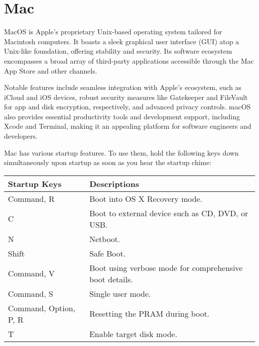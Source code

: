 \chapter{Mac}
\thispagestyle{fancy}
\lstset{}\lstset{language=Bash, style=shellstyle}

MacOS is Apple's proprietary Unix-based operating system tailored for Macintosh computers. It boasts a sleek graphical user interface (GUI) atop a Unix-like foundation, offering stability and security. Its software ecosystem encompasses a broad array of third-party applications accessible through the Mac App Store and other channels.

Notable features include seamless integration with Apple's ecosystem, such as iCloud and iOS devices, robust security measures like Gatekeeper and FileVault for app and disk encryption, respectively, and advanced privacy controls. macOS also provides essential productivity tools and development support, including Xcode and Terminal, making it an appealing platform for software engineers and developers.


\begin{fancybox}{}	
	Mac has various startup features. To use them, hold the following keys down simultaneously upon startup as soon as you hear the startup chime:
	\begin{center}
		\begin{tabular}{l|l}
			Startup Keys & Descriptions \\
			\hline
			Command, R & Boot into OS X Recovery mode. \\
			C & Boot to external device such as CD, DVD, or USB. \\
			N & Netboot. \\
			Shift & Safe Boot. \\
			Command, V & Boot using verbose mode for comprehensive boot details. \\
			Command, S & Single user mode. \\
			Command, Option, P, R & Resetting the PRAM during boot. \\
			T & Enable target disk mode.
		\end{tabular}
	\end{center}
\end{fancybox}



